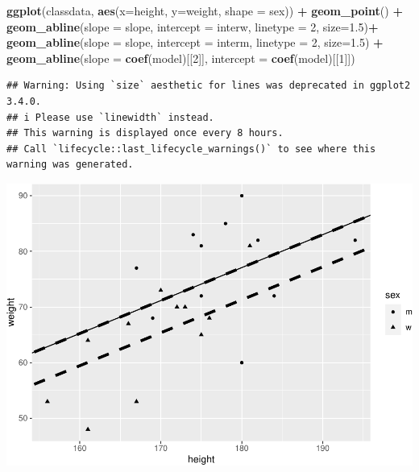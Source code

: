 \documentclass[
  doc]{apa6}
\newenvironment{Shaded}{\begin{snugshade}}{\end{snugshade}}
\newcommand{\AttributeTok}[1]{\textcolor[rgb]{0.13,0.29,0.53}{#1}}
\newcommand{\DecValTok}[1]{\textcolor[rgb]{0.00,0.00,0.81}{#1}}
\newcommand{\FloatTok}[1]{\textcolor[rgb]{0.00,0.00,0.81}{#1}}
\newcommand{\FunctionTok}[1]{\textcolor[rgb]{0.13,0.29,0.53}{\textbf{#1}}}
\newcommand{\NormalTok}[1]{#1}
\newcommand{\SpecialCharTok}[1]{\textcolor[rgb]{0.81,0.36,0.00}{\textbf{#1}}}
\begin{document}
\begin{Shaded}
\begin{Highlighting}[]
\FunctionTok{ggplot}\NormalTok{(classdata, }\FunctionTok{aes}\NormalTok{(}\AttributeTok{x=}\NormalTok{height, }\AttributeTok{y=}\NormalTok{weight, }\AttributeTok{shape =}\NormalTok{ sex)) }\SpecialCharTok{+}
  \FunctionTok{geom\_point}\NormalTok{() }\SpecialCharTok{+}
  \FunctionTok{geom\_abline}\NormalTok{(}\AttributeTok{slope =}\NormalTok{ slope, }\AttributeTok{intercept =}\NormalTok{ interw, }\AttributeTok{linetype =} \DecValTok{2}\NormalTok{, }\AttributeTok{size=}\FloatTok{1.5}\NormalTok{)}\SpecialCharTok{+}
  \FunctionTok{geom\_abline}\NormalTok{(}\AttributeTok{slope =}\NormalTok{ slope, }\AttributeTok{intercept =}\NormalTok{ interm, }\AttributeTok{linetype =} \DecValTok{2}\NormalTok{, }\AttributeTok{size=}\FloatTok{1.5}\NormalTok{) }\SpecialCharTok{+}
  \FunctionTok{geom\_abline}\NormalTok{(}\AttributeTok{slope =} \FunctionTok{coef}\NormalTok{(model)[[}\DecValTok{2}\NormalTok{]], }\AttributeTok{intercept =} \FunctionTok{coef}\NormalTok{(model)[[}\DecValTok{1}\NormalTok{]]) }
\end{Highlighting}
\end{Shaded}

\begin{verbatim}
## Warning: Using `size` aesthetic for lines was deprecated in ggplot2 3.4.0.
## i Please use `linewidth` instead.
## This warning is displayed once every 8 hours.
## Call `lifecycle::last_lifecycle_warnings()` to see where this warning was generated.
\end{verbatim}

\includegraphics{rmd_reg_files/figure-latex/unnamed-chunk-12-1.pdf}
\end{document}
